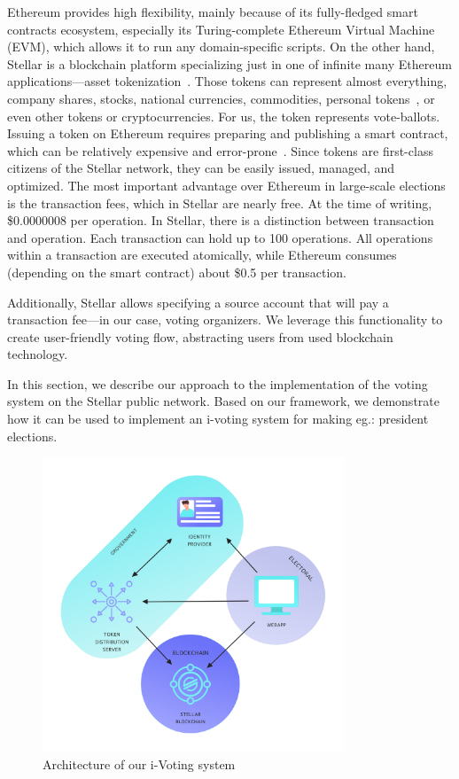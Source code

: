 \documentclass[applsci,article,submit,moreauthors,pdftex]{Definitions/mdpi}
\begin{document}
Ethereum provides high flexibility, mainly because of its fully-fledged smart contracts ecosystem, especially its Turing-complete Ethereum Virtual Machine (EVM), which allows it to run any domain-specific scripts. 
On the other hand, Stellar is a blockchain platform specializing just in one of infinite many Ethereum applications––asset tokenization~\cite{li2019tokenization}. Those tokens can represent almost everything, company shares, stocks, national currencies, commodities, personal tokens~\cite{Personal27:online}, or even other tokens or cryptocurrencies. For us, the token represents vote-ballots. 
Issuing a token on Ethereum requires preparing and publishing a smart contract, which can be relatively expensive and error-prone~\cite{Analysis57:online}.
Since tokens are first-class citizens of the Stellar network, they can be easily issued, managed, and optimized. The most important advantage over Ethereum in large-scale elections is the transaction fees, which in Stellar are nearly free. At the time of writing, \$0.0000008 per operation. In Stellar, there is a distinction between transaction and operation. Each transaction can hold up to 100 operations. All operations within a transaction are executed atomically, while Ethereum consumes (depending on the smart contract) about \$0.5 per transaction. 

Additionally, Stellar allows specifying a source account that will pay a transaction fee––in our case, voting organizers. We leverage this functionality to create user-friendly voting flow, abstracting users from used blockchain technology.

In this section, we describe our approach to the implementation of the voting system on the Stellar public network. Based on our framework, we demonstrate how it can be used to implement an i-voting system
for making eg.: president elections. %

\begin{figure}[h!]
\includegraphics[width=9cm]{figs/stellot-architecture.png}
\centering
\caption{Architecture of our i-Voting system}
\label{fig:architecture}
\end{figure} 
\end{document}
